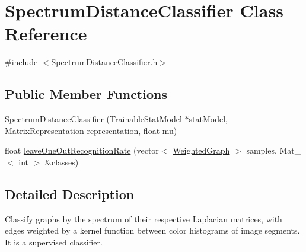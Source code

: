 \hypertarget{class_spectrum_distance_classifier}{\section{Spectrum\-Distance\-Classifier Class Reference}
\label{class_spectrum_distance_classifier}
}


{\ttfamily \#include $<$Spectrum\-Distance\-Classifier.\-h$>$}

\subsection*{Public Member Functions}
\begin{DoxyCompactItemize}
\item 
\hyperlink{class_spectrum_distance_classifier_aef940f0df327ecef89b9951a2cf8b0fd}{Spectrum\-Distance\-Classifier} (\hyperlink{class_trainable_stat_model}{Trainable\-Stat\-Model} $\ast$stat\-Model, Matrix\-Representation representation, float mu)
\item 
float \hyperlink{class_spectrum_distance_classifier_a315f5a1843840116e503005ac15db6c1}{leave\-One\-Out\-Recognition\-Rate} (vector$<$ \hyperlink{class_weighted_graph}{Weighted\-Graph} $>$ samples, Mat\-\_\-$<$ int $>$ \&classes)
\end{DoxyCompactItemize}


\subsection{Detailed Description}
Classify graphs by the spectrum of their respective Laplacian matrices, with edges weighted by a kernel function between color histograms of image segments. It is a supervised classifier. 

